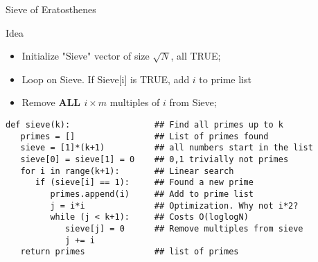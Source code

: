 \begin{frame}[fragile]{Sieve of Eratosthenes}

    \begin{block}{Idea}
      \begin{itemize}
      \item Initialize "Sieve" vector of size $\sqrt{N}$, all TRUE;
      \item Loop on Sieve. If Sieve[i] is TRUE, add $i$ to prime list
      \item Remove {\bf ALL $i\times m$} multiples of $i$ from Sieve;
      \end{itemize}
    \end{block}

    {\smaller
  \begin{exampleblock}{}
\begin{verbatim}
def sieve(k):                 ## Find all primes up to k
   primes = []                ## List of primes found
   sieve = [1]*(k+1)          ## all numbers start in the list
   sieve[0] = sieve[1] = 0    ## 0,1 trivially not primes
   for i in range(k+1):       ## Linear search
      if (sieve[i] == 1):     ## Found a new prime
         primes.append(i)     ## Add to prime list
         j = i*i              ## Optimization. Why not i*2?
         while (j < k+1):     ## Costs O(loglogN)
            sieve[j] = 0      ## Remove multiples from sieve
            j += i
   return primes              ## list of primes
\end{verbatim}
  \end{exampleblock}
  }
\end{frame}

